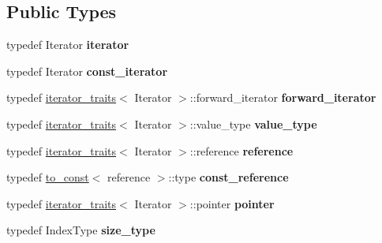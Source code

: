 \subsection*{Public Types}
\begin{DoxyCompactItemize}
\item 
\mbox{\label{structcugar_1_1vector__view_af9c2325c1647f4e91441ecac908517d3}} 
typedef Iterator {\bfseries iterator}
\item 
\mbox{\label{structcugar_1_1vector__view_afbf762f45569835c1ab8b6c0f8340bba}} 
typedef Iterator {\bfseries const\+\_\+iterator}
\item 
\mbox{\label{structcugar_1_1vector__view_adf7cfbbdb7be3613b4218454aa7da674}} 
typedef \hyperlink{structcugar_1_1iterator__traits}{iterator\+\_\+traits}$<$ Iterator $>$\+::forward\+\_\+iterator {\bfseries forward\+\_\+iterator}
\item 
\mbox{\label{structcugar_1_1vector__view_a957d49f4c9f029e6dcd251f95e6963eb}} 
typedef \hyperlink{structcugar_1_1iterator__traits}{iterator\+\_\+traits}$<$ Iterator $>$\+::value\+\_\+type {\bfseries value\+\_\+type}
\item 
\mbox{\label{structcugar_1_1vector__view_a302a9325f6b42c7c43aa171c8aeb1340}} 
typedef \hyperlink{structcugar_1_1iterator__traits}{iterator\+\_\+traits}$<$ Iterator $>$\+::reference {\bfseries reference}
\item 
\mbox{\label{structcugar_1_1vector__view_af17e8a5ccb7b1040cf6292300a0f1e6f}} 
typedef \hyperlink{structcugar_1_1to__const}{to\+\_\+const}$<$ reference $>$\+::type {\bfseries const\+\_\+reference}
\item 
\mbox{\label{structcugar_1_1vector__view_a1f4f3efed26b6035460add81fb8cbcaf}} 
typedef \hyperlink{structcugar_1_1iterator__traits}{iterator\+\_\+traits}$<$ Iterator $>$\+::pointer {\bfseries pointer}
\item 
\mbox{\label{structcugar_1_1vector__view_a432db2398511ecf0dd6ccd93df0c4c2f}} 
typedef Index\+Type {\bfseries size\+\_\+type}

\end{DoxyCompactItemize}
